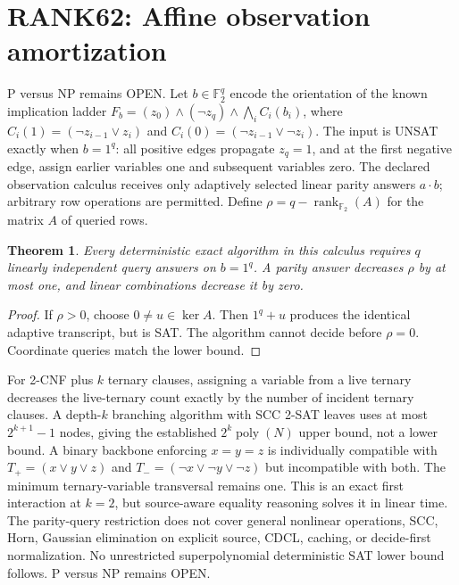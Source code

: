 \documentclass{article}
\newtheorem{theorem}{Theorem}
\begin{document}
\section*{RANK62: Affine observation amortization}
P versus NP remains OPEN.
Let $b\in\mathbb F_2^q$ encode the orientation of the known implication ladder
$F_b=(z_0)\wedge(\neg z_q)\wedge\bigwedge_i C_i(b_i)$,
where $C_i(1)=(\neg z_{i-1}\vee z_i)$ and
$C_i(0)=(\neg z_{i-1}\vee\neg z_i)$.
The input is UNSAT exactly when $b=1^q$:
all positive edges propagate $z_q=1$, and at the first negative edge,
assign earlier variables one and subsequent variables zero.
The declared observation calculus receives only adaptively selected
linear parity answers $a\cdot b$; arbitrary row operations are permitted.
Define $\rho=q-\operatorname{rank}_{\mathbb F_2}(A)$ for the matrix
$A$ of queried rows.
\begin{theorem}
Every deterministic exact algorithm in this calculus requires $q$
linearly independent query answers on $b=1^q$. A parity answer decreases
$\rho$ by at most one, and linear combinations decrease it by zero.
\end{theorem}
\begin{proof}
If $\rho>0$, choose $0\ne u\in\ker A$.
Then $1^q+u$ produces the identical adaptive transcript, but is SAT.
The algorithm cannot decide before $\rho=0$. Coordinate queries match
the lower bound.
\end{proof}
For 2-CNF plus $k$ ternary clauses, assigning a variable from a live
ternary decreases the live-ternary count exactly by the number of
incident ternary clauses. A depth-$k$ branching algorithm with SCC 2-SAT
leaves uses at most $2^{k+1}-1$ nodes, giving the established
$2^k\operatorname{poly}(N)$ upper bound, not a lower bound.
A binary backbone enforcing $x=y=z$ is individually compatible with
$T_+=(x\vee y\vee z)$ and $T_-=(\neg x\vee\neg y\vee\neg z)$
but incompatible with both. The minimum ternary-variable transversal
remains one. This is an exact first interaction at $k=2$,
but source-aware equality reasoning solves it in linear time.
The parity-query restriction does not cover general nonlinear operations,
SCC, Horn, Gaussian elimination on explicit source, CDCL, caching,
or decide-first normalization. No unrestricted superpolynomial
deterministic SAT lower bound follows. P versus NP remains OPEN.
\end{document}
